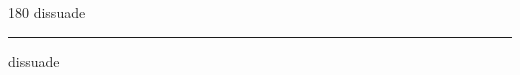 
\begin{frame}
\begin{center}
\begin{turn}{180}
{\fontsize{2.5cm}{1em}\selectfont dissuade}
\end{turn}
\vspace{1em}\par  
\hrule
\vspace{1em}\par  
{\fontsize{2.5cm}{1em}\selectfont dissuade}
\end{center}
\end{frame}
